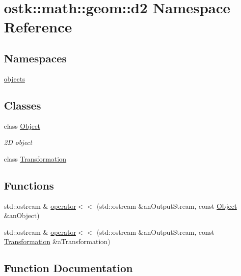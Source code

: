 \hypertarget{namespaceostk_1_1math_1_1geom_1_1d2}{}\section{ostk\+:\+:math\+:\+:geom\+:\+:d2 Namespace Reference}
\label{namespaceostk_1_1math_1_1geom_1_1d2}
\subsection*{Namespaces}
\begin{DoxyCompactItemize}
\item 
 \hyperlink{namespaceostk_1_1math_1_1geom_1_1d2_1_1objects}{objects}
\end{DoxyCompactItemize}
\subsection*{Classes}
\begin{DoxyCompactItemize}
\item 
class \hyperlink{classostk_1_1math_1_1geom_1_1d2_1_1_object}{Object}
\begin{DoxyCompactList}\small\item\em 2D object \end{DoxyCompactList}\item 
class \hyperlink{classostk_1_1math_1_1geom_1_1d2_1_1_transformation}{Transformation}
\end{DoxyCompactItemize}
\subsection*{Functions}
\begin{DoxyCompactItemize}
\item 
std\+::ostream \& \hyperlink{namespaceostk_1_1math_1_1geom_1_1d2_a810b45a7a36ac746e594df799b6c0d64}{operator$<$$<$} (std\+::ostream \&an\+Output\+Stream, const \hyperlink{classostk_1_1math_1_1geom_1_1d2_1_1_object}{Object} \&an\+Object)
\item 
std\+::ostream \& \hyperlink{namespaceostk_1_1math_1_1geom_1_1d2_af5bcbd713b1bc06beb1eaa22e759fb33}{operator$<$$<$} (std\+::ostream \&an\+Output\+Stream, const \hyperlink{classostk_1_1math_1_1geom_1_1d2_1_1_transformation}{Transformation} \&a\+Transformation)
\end{DoxyCompactItemize}


\subsection{Function Documentation}
\mbox{\label{namespaceostk_1_1math_1_1geom_1_1d2_a810b45a7a36ac746e594df799b6c0d64}} 
